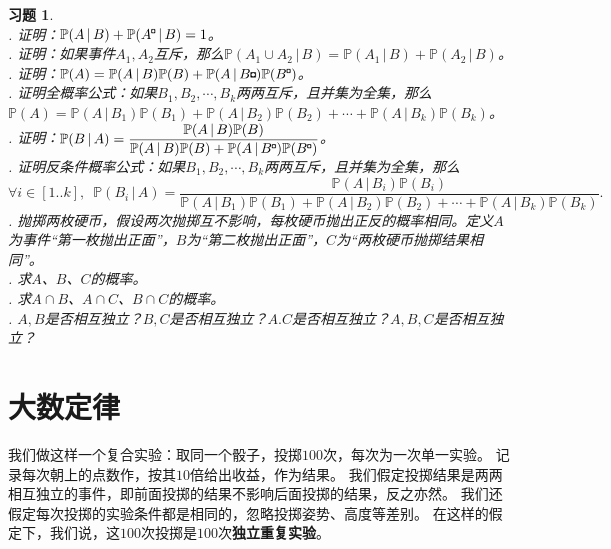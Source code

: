 \documentclass[12pt,UTF8]{ctexbook}
\theoremstyle{definition}
\theoremstyle{plain}
\newtheorem{xt}{习题}[section]
\newcommand{\bu}{\mathbin{\text{\tikz[baseline=-0.6ex]{
    \node[draw, fill=black, minimum size=0.8ex, inner sep=0pt, rectangle] (bu) {};
    \node[draw=none, fill=white, minimum size=0.6ex, inner sep=0pt, circle] at (bu.center) {};
}}}}
\begin{document}
\begin{xt}
    \mbox{} \\
    . 证明：$\mathbb{P}(A \, | \, B) + \mathbb{P}(A^{\bu} \, | \, B) = 1$。 \\
    . 证明：如果事件$A_1,A_2$互斥，那么$\mathbb{P}(A_1 \cup A_2\, | \, B) = \mathbb{P}(A_1 \, | \, B) + \mathbb{P}(A_2 \, | \, B)$。 \\
    . 证明：$\mathbb{P}(A) = \mathbb{P}(A \, | \, B) \mathbb{P}(B) + \mathbb{P}(A \, | \, B{\bu}) \mathbb{P}(B^{\bu})$。 \\
    . 证明全概率公式：如果$B_1, B_2, \cdots, B_k$两两互斥，且并集为全集，那么$\mathbb{P}(A) = \mathbb{P}(A \, | \, B_1) \mathbb{P}(B_1) + \mathbb{P}(A \, | \, B_2) \mathbb{P}(B_2) + \cdots + \mathbb{P}(A \, | \, B_k) \mathbb{P}(B_k)$。 \\
    . 证明：$\displaystyle\mathbb{P}(B \, | \, A) = \frac{\mathbb{P}(A \, | \, B) \mathbb{P}(B)}{\mathbb{P}(A \, | \, B) \mathbb{P}(B) + \mathbb{P}(A \, | \, B^{\bu}) \mathbb{P}(B^{\bu})}$。 \\
    . 证明反条件概率公式：如果$B_1, B_2, \cdots, B_k$两两互斥，且并集为全集，那么
    $$\forall i\in[1..k], \,\,\, \mathbb{P}(B_i \, | \, A) = \frac{\mathbb{P}(A \, | \, B_i) \mathbb{P}(B_i)}{\mathbb{P}(A \, | \, B_1) \mathbb{P}(B_1) + \mathbb{P}(A \, | \, B_2) \mathbb{P}(B_2) + \cdots + \mathbb{P}(A \, | \, B_k) \mathbb{P}(B_k)}.$$ 
    . 抛掷两枚硬币，假设两次抛掷互不影响，每枚硬币抛出正反的概率相同。定义$A$为事件“第一枚抛出正面”，$B$为“第二枚抛出正面”，$C$为“两枚硬币抛掷结果相同”。 \\
    . 求$A$、$B$、$C$的概率。\\
    . 求$A\cap B$、$A\cap C$、$B \cap C$的概率。\\
    . $A,B$是否相互独立？$B,C$是否相互独立？$A.C$是否相互独立？$A,B,C$是否相互独立？
\end{xt}

\section{大数定律}

我们做这样一个复合实验：取同一个骰子，投掷$100$次，每次为一次单一实验。
记录每次朝上的点数作，按其$10$倍给出收益，作为结果。
我们假定投掷结果是两两相互独立的事件，即前面投掷的结果不影响后面投掷的结果，反之亦然。
我们还假定每次投掷的实验条件都是相同的，忽略投掷姿势、高度等差别。
在这样的假定下，我们说，这$100$次投掷是$100$次\textbf{独立重复实验}。
\end{document}
